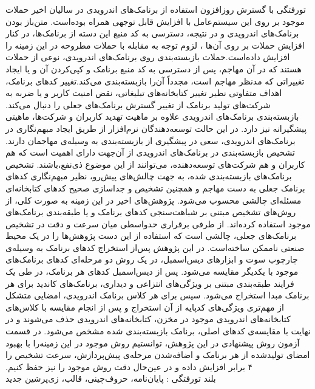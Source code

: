 


‌تورفتگی
‫با گسترش روزافزون استفاده از برنامک‌های اندرویدی  در سالیان اخیر حملات موجود بر روی این سیستم‌عامل با افزایش قابل توجهی همراه بوده‌است. متن‌باز بودن برنامک‌های اندرویدی و در نتیجه، دسترسی به کد منبع این دسته از برنامک‌ها، در کنار افزایش حملات بر روی آن‌ها ، لزوم توجه به مقابله با حملات مطروحه در این زمینه‌ را افزایش داده‌است.حملات بازبسته‌بندی روی برنامک‌های اندرویدی، نوعی از حملات هستند که در آن مهاجم، پس از دسترسی به کد منبع برنامک و کپی‌کردن آن و یا ایجاد تغییراتی که مدنظر مهاجم است، مجدداً آن‌را بازبسته‌بندی می‌کند.تغییر کد‌های برنامک، اهداف متفاوتی نظیر تغییر کتابخانه‌های تبلیغاتی، نقض امنیت کاربر و یا ضربه به شرکت‌های تولید برنامک‌ از تغییر گسترش برنامک‌های جعلی را دنبال می‌کند. بازبسته‌بندی برنامک‌های اندرویدی علاوه بر ماهیت تهدید کاربران و شرکت‌ها، ماهیتی پیشگیرانه نیز دارد. در این حالت توسعه‌دهندگان نرم‌افزار از طریق ایجاد مبهم‌نگاری در برنامک‌های اندرویدی، سعی در پیشگیری از بازبسته‌بندی به وسیله‌ی مهاجمان دارند. تشخیص بازبسته‌بندی در برنامک‌های اندرویدی از آن‌جهت دارا‌ی اهمیت است که هم کاربران و هم شرکت‌های توسعه‌دهنده، می‌توانند از این موضوع ذی‌نفع،باشند. تشخیص‌ برنامک‌های بازبسته‌بندی شده، به جهت چالش‌های پیش‌رو، نظیر مبهم‌نگاری کد‌های برنامک‌‌ جعلی به دست مهاجم و همچنین تشخیص و جداسازی صحیح کد‌های کتابخانه‌ای مسئله‌ای چالشی محسوب می‌شود. پژوهش‌های اخیر در این زمینه به صورت کلی، از روش‌‌های تشخیص مبتنی بر شباهت‌سنجی کد‌های برنامک و یا طبقه‌بندی برنامک‌های موجود استفاده‌ کرده‌اند. از طرفی برقراری حد‌واسطی میان سرعت‌ و دقت در تشخیص برنامک‌های جعلی، چالشی است که استفاده از این دست پژوهش‌ها را در یک محیط صنعتی ناممکن ساخته‌است. در این پژوهش پس‌از استخراج کد‌های برنامک به وسیله‌ی چارچوب سوت و ابزار‌های دیس‌اسمبل، در یک روش دو مرحله‌ای کد‌های برنامک‌های موجود با یکدیگر مقایسه می‌شود. پس از دیس‌اسمبل کد‌های هر برنامک، در طی یک فرایند طبقه‌بندی مبتنی بر ویژگی‌های انتزاعی و دیداری، برنامک‌های کاندید برای هر برنامک مبدا استخراج می‌شود. سپس برای هر کلاس برنامک‌ اندرویدی، امضایی متشکل از مهم‌تری ویژگی‌های کد‌پایه از آن استخراج و پس از انجام مقایسه‌ با کلاس‌های کتابخانه‌های اندرویدی موجود در مخزن، کتابخانه‌های اندرویدی حذف می‌شوند و در نهایت با مقایسه‌ی کد‌های اصلی، برنامک‌ بازبسته‌بندی‌ شده مشخص می‌شود.
در قسمت آزمون روش پیشنهادی در این پژوهش، توانستیم روش موجود در این زمینه‌را با بهبود امضا‌ی تولید‌شده از هر برنامک و اضافه‌شدن مرحله‌ی پیش‌پردازش، سرعت تشخیص را ۴ برابر افزایش داده و در عین‌حال دقت روش موجود را نیز حفظ‌ کنیم.  
 \\
‌بلند
‌تورفتگی : 
پایان‌نامه، حروف‌چینی، قالب، زی‌پرشین
‌جدید